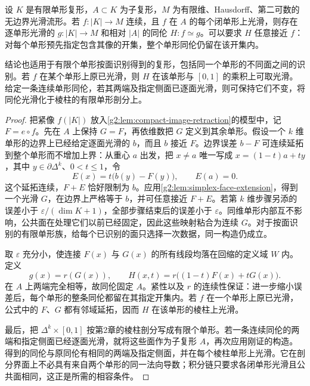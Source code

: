 \begin{lemma}\label{g2:lem:relative-simplex-smoothing}
	设 \(K\) 是有限单形复形，\(A\subset K\) 为子复形，\(M\) 为有限维、Hausdorff、第二可数的无边界光滑流形。若 \(f:|K|\to M\) 连续，且 \(f\) 在 \(A\) 的每个闭单形上光滑，则存在逐单形光滑的 \(g:|K|\to M\) 和相对 \(|A|\) 的同伦 \(H:f\simeq g\)。可以要求 \(H\) 任意接近 \(f\)：对每个单形预先指定包含其像的开集，整个单形同伦仍留在该开集内。

	结论也适用于有限个单形按面识别得到的复形，包括同一个单形的不同面之间的识别。若 \(f\) 在某个单形上原已光滑，则 \(H\) 在该单形与 \([0,1]\) 的乘积上可取光滑。给定一条连续单形同伦，若其两端及指定侧面已逐面光滑，则可保持它们不变，将同伦光滑化于棱柱的有限单形剖分上。
\end{lemma}
\begin{proof}
	把紧像 \(f(|K|)\) 放入\cref{g2:lem:compact-image-retraction}的模型中，记 \(F=e\circ f\)。先在 \(A\) 上保持 \(G=F\)，再依维数把 \(G\) 定义到其余单形。假设一个 \(k\) 维单形的边界上已经给定逐面光滑的 \(b\)，而且 \(b\) 接近 \(F\)。边界误差 \(b-F\) 可连续延拓到整个单形而不增加上界：从重心 \(a\) 出发，把 \(x\ne a\) 唯一写成 \(x=(1-t)a+ty\)，其中 \(y\in\partial\Delta^k\)、\(0<t\leq1\)，令
	\[
		E(x)=t\bigl(b(y)-F(y)\bigr),\qquad E(a)=0.
	\]
	这个延拓连续，\(F+E\) 恰好限制为 \(b\)。应用\cref{g2:lem:simplex-face-extension}，得到一个光滑 \(G\)，在边界上严格等于 \(b\)，并可任意接近 \(F+E\)。若第 \(k\) 维步骤另添的误差小于 \(\varepsilon/(\dim K+1)\)，全部步骤结束后的误差小于 \(\varepsilon\)。同维单形内部互不影响，公共面在处理它们以前已经固定，因此这些映射粘合为连续 \(G\)。对于按面识别的有限单形族，给每个已识别的面只选择一次数据，同一构造仍成立。

	取 \(\varepsilon\) 充分小，使连接 \(F(x)\) 与 \(G(x)\) 的所有线段均落在回缩的定义域 \(W\) 内。定义
	\begin{equation}\label{g2:eq:relative-smoothing-homotopy}
		g(x)=r(G(x)),\qquad H(x,t)=r\bigl((1-t)F(x)+tG(x)\bigr).
	\end{equation}
	在 \(A\) 上两端完全相等，故同伦固定 \(A\)。紧性以及 \(r\) 的连续性保证：进一步缩小误差后，每个单形的整条同伦都留在其指定开集内。若 \(f\) 在一个单形上原已光滑，公式中的 \(F\)、\(G\) 都有邻域延拓，因而 \(H\) 在该单形的棱柱上光滑。

	最后，把 \(\Delta^k\times[0,1]\) 按第2章的棱柱剖分写成有限个单形。若一条连续同伦的两端和指定侧面已经逐面光滑，就将这些面作为子复形 \(A\)，再次应用刚证的构造。得到的同伦与原同伦有相同的两端及指定侧面，并在每个棱柱单形上光滑。它在剖分界面上不必具有来自两个单形的同一法向导数；积分链只要求各闭单形光滑且公共面相同，这正是所需的相容条件。
\end{proof}

